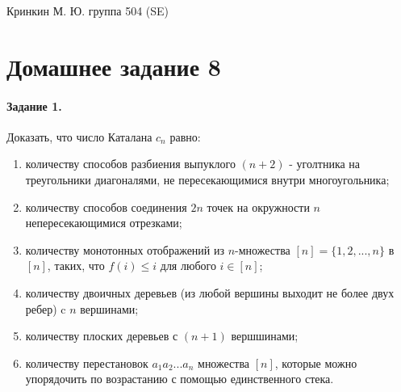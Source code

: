 \documentclass[a4paper,12pt]{article}
\begin{document}
\sloppy

\lstset{
	basicstyle=\small,
	stringstyle=\ttfamily,
	showstringspaces=false,
	columns=fixed,
	breaklines=true,
	numbers=right,
	numberstyle=\tiny
}

\newtheorem{Def}{Определение}[section]
\newtheorem{Th}{Теорема}
\newtheorem{Lem}[Th]{Лемма}
\newenvironment{Proof}
	{\par\noindent{\bf Доказательство.}}
	{\hfill$\scriptstyle\blacksquare$}
\newenvironment{Solution}
	{\par\noindent{\bf Решение.}}
	{\hfill$\scriptstyle\blacksquare$}


\begin{flushright}
	Кринкин М. Ю. группа 504 (SE)
\end{flushright}

\section{Домашнее задание 8}

\paragraph{Задание 1.} Доказать, что число Каталана $c_n$ равно:
\begin{enumerate}
\item количеству способов разбиения выпуклого $(n+2)$ - уголтника на треугольники диагоналями, не пересекающимися внутри многоугольника;

\item количеству способов соединения $2n$ точек на окружности $n$ непересекающимися отрезками;

\item количеству монотонных отображений из $n$-множества $\left[n\right] = \{1, 2, ..., n\}$ в $\left[n\right]$, таких, что $f\left(i\right) \le i$ для любого $i \in \left[n\right]$;

\item количеству двоичных деревьев (из любой вершины выходит не более двух ребер) c $n$ вершинами;

\item количеству плоских деревьев с $\left(n+1\right)$ вершшинами;

\item количеству перестановок $a_1a_2...a_n$ множества $\left[n\right]$, которые можно упорядочить по возрастанию с помощью единственного стека.
\end{enumerate}
\end{document}
